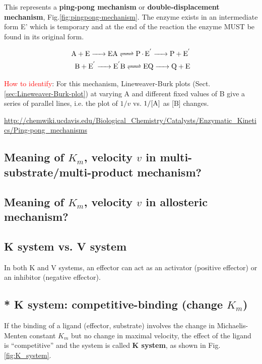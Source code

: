 This represents a {\bf ping-pong mechanism} or {\bf double-displacement
mechanism}, Fig.\ref{fig:pingpong-mechanism}. The enzyme exists in an
intermediate form E' which is temporary and at the end of the reaction the
enzyme MUST be found in its original form.

\begin{equation}
\begin{split}
\ce{A + E -> EA <=> P.E^' -> P + E^' } \\
\ce{B + E^' -> E^'B <=> EQ -> Q + E}
\end{split}
\end{equation}

\textcolor{red}{How to identify}: 
For this mechanism, Lineweaver-Burk plots
(Sect.\ref{sec:Lineweaver-Burk-plot}) at varying A and different fixed values of
B give a series of parallel lines, i.e. the plot of $1/v$ vs. $1/\ce{[A]}$ as
[B] changes.

\url{http://chemwiki.ucdavis.edu/Biological_Chemistry/Catalysts/Enzymatic_Kinetics/Ping-pong_mechanisms}

\subsection{Meaning of $K_m$, velocity $v$ in multi-substrate/multi-product
mechanism?}


\subsection{Meaning of $K_m$, velocity $v$ in allosteric mechanism?}

\subsection{K system vs. V system}

In both K and V systems, an effector can act as an activator (positive effector)
or an inhibitor (negative effector).

\subsection{* K system: competitive-binding (change $K_m$)}


If the binding of a ligand (effector, substrate) involves the change
in Michaelis-Menten constant $K_m$ but no change in maximal velocity,
the effect of the ligand is ``competitive'' and the system is called
{\bf K system}, as shown in Fig. \ref{fig:K_system}. 

